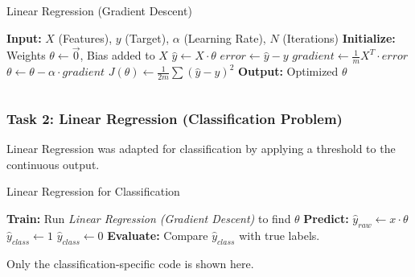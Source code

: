 \documentclass[11pt]{article}
\begin{document}
\begin{algorithm}[H]
    \caption{Linear Regression (Gradient Descent)}
    \begin{algorithmic}[1]
        \State \textbf{Input:} $X$ (Features), $y$ (Target), $\alpha$ (Learning Rate), $N$ (Iterations)
        \State \textbf{Initialize:} Weights $\theta \gets \vec{0}$, Bias added to $X$
        \State $\hat{y} \gets X \cdot \theta$ 
        \State $error \gets \hat{y} - y$
        \State $gradient \gets \frac{1}{m} X^T \cdot error$
        \State $\theta \gets \theta - \alpha \cdot gradient$ 
        \State $J(\theta) \gets \frac{1}{2m} \sum (\hat{y} - y)^2$ 
        \EndFor
        \State \textbf{Output:} Optimized $\theta$
    \end{algorithmic}
\end{algorithm}

\begin{multicols}{2}
    \inputminted{python}{assets/1_linReg_reg.py}
\end{multicols}

\subsubsection{Task 2: Linear Regression (Classification Problem)}
Linear Regression was adapted for classification by applying a threshold to the continuous output.

\begin{algorithm}[H]
    \caption{Linear Regression for Classification}
    \begin{algorithmic}[1]
        \State \textbf{Train:} Run \textit{Linear Regression (Gradient Descent)} to find $\theta$
        \State \textbf{Predict:}
        \State $\hat{y}_{raw} \gets x \cdot \theta$
        \State $\hat{y}_{class} \gets 1$
        \Else
        \State $\hat{y}_{class} \gets 0$
        \EndIf
        \EndFor
        \State \textbf{Evaluate:} Compare $\hat{y}_{class}$ with true labels.
    \end{algorithmic}
\end{algorithm}

\begin{multicols}{2}
    Only the classification-specific code is shown here.
    \inputminted{python}{assets/2_linReg_cls.py}
\end{multicols}
\end{document}
